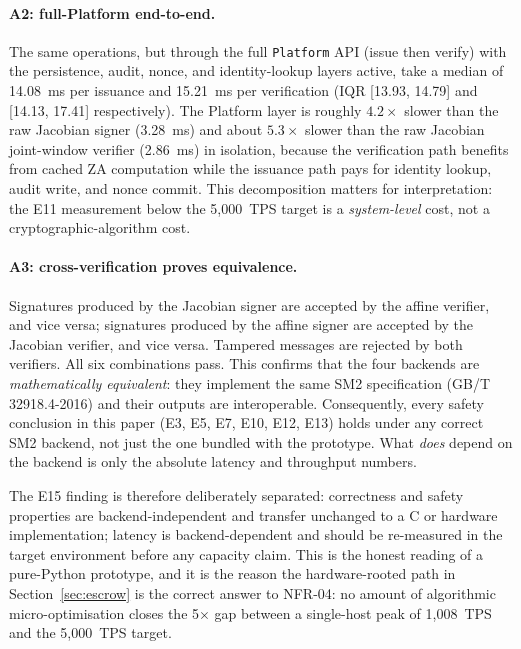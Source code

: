 \documentclass[10pt,twocolumn]{IEEEtran}
\begin{document}
\paragraph{A2: full-Platform end-to-end.} The same operations, but
through the full \texttt{Platform} API (issue then verify) with the
persistence, audit, nonce, and identity-lookup layers active, take a
median of 14.08~ms per issuance and 15.21~ms per verification (IQR
[13.93, 14.79] and [14.13, 17.41] respectively). The Platform
layer is roughly $4.2\times$ slower than the raw Jacobian signer
(3.28~ms) and about $5.3\times$ slower than the raw Jacobian
joint-window verifier (2.86~ms)
in isolation, because the verification path benefits from cached
ZA computation while the issuance path pays for identity lookup,
audit write, and nonce commit. This decomposition matters for
interpretation: the E11 measurement below the 5,000~TPS target is a
\emph{system-level} cost, not a cryptographic-algorithm cost.

\paragraph{A3: cross-verification proves equivalence.} Signatures
produced by the Jacobian signer are accepted by the affine verifier,
and vice versa; signatures produced by the affine signer are accepted
by the Jacobian verifier, and vice versa. Tampered messages are
rejected by both verifiers. All six combinations pass. This confirms
that the four backends are \emph{mathematically equivalent}: they
implement the same SM2 specification (GB/T 32918.4-2016) and their
outputs are interoperable. Consequently, every safety conclusion
in this paper (E3, E5, E7, E10, E12, E13) holds under any correct
SM2 backend, not just the one bundled with the prototype. What
\emph{does} depend on the backend is only the absolute latency and
throughput numbers.

The E15 finding is therefore deliberately separated: correctness and
safety properties are backend-independent and transfer unchanged to
a C or hardware implementation; latency is backend-dependent and
should be re-measured in the target environment before any capacity
claim. This is the honest reading of a pure-Python prototype, and
it is the reason the hardware-rooted path in Section~\ref{sec:escrow}
is the correct answer to NFR-04: no amount of algorithmic
micro-optimisation closes the 5$\times$ gap between a single-host
peak of 1,008~TPS and the 5,000~TPS target.

\end{document}
